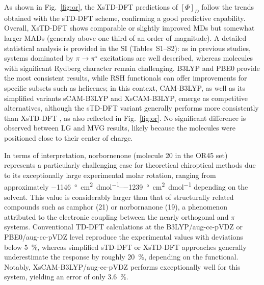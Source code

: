 \documentclass[%
 aip,
 amsmath,amssymb,
preprint,%
]{revtex4-2}
\begin{document}
As shown in Fig.~\ref{fig:or}, the XsTD-DFT predictions of $[\Phi]_D$ follow the trends obtained with the sTD-DFT scheme, confirming a good predictive capability.  
Overall, XsTD-DFT shows comparable or slightly improved MDs but somewhat larger MADs (generaly above one third of an order of magnitude).  
A detailed statistical analysis is provided in the SI (Tables~S1--S2): as in previous studies, systems dominated by $\pi \to \pi^\star$ excitations are well described, whereas molecules with significant Rydberg character remain challenging.  
B3LYP and PBE0 provide the most consistent results, while RSH functionals can offer improvements for specific subsets such as helicenes; in this context, CAM-B3LYP, as well as its simplified variants sCAM-B3LYP and XsCAM-B3LYP, emerge as competitive alternatives, although the sTD-DFT variant generally performs more consistently than XsTD-DFT , as also reflected in Fig.~\ref{fig:or}.  
No significant difference is observed between LG and MVG results, likely because the molecules were positioned close to their center of charge.

In terms of interpretation, norbornenone (molecule 20 in the OR45 set) represents a particularly challenging case for theoretical chiroptical methods due to its exceptionally large experimental molar rotation, ranging from approximately \SIrange{-1146}{-1239}{\degree\centi\meter\squared\per\deci\mole} depending on the solvent.  
This value is considerably larger than that of structurally related compounds such as camphor (21) or norbornanone (19), a phenomenon attributed to the electronic coupling between the nearly orthogonal  and  $\pi$ systems.  
Conventional TD-DFT calculations at the B3LYP/aug-cc-pVDZ or PBE0/aug-cc-pVDZ level reproduce the experimental values with deviations below \SI{5}{\percent}, whereas simplified sTD-DFT or XsTD-DFT approaches generally underestimate the response by roughly \SI{20}{\percent}, depending on the functional.  
Notably, XsCAM-B3LYP/aug-cc-pVDZ performs exceptionally well for this system, yielding an error of only \SI{3.6}{\percent}.
\end{document}
